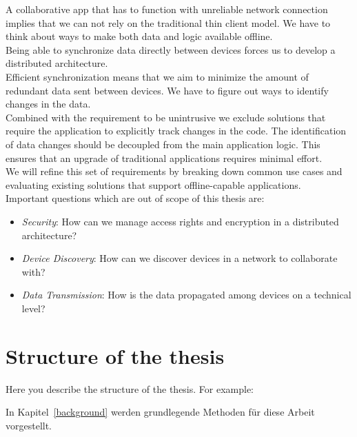 A collaborative app that has to function with unreliable network connection implies that we can not rely on the traditional thin client model.
We have to think about ways to make both data and logic available offline.\\

Being able to synchronize data directly between devices forces us to develop a distributed architecture.\\

Efficient synchronization means that we aim to minimize the amount of redundant data sent between devices.
We have to figure out ways to identify changes in the data.\\

Combined with the requirement to be unintrusive we exclude solutions that require the application to explicitly track changes in the code.
The identification of data changes should be decoupled from the main application logic.
This ensures that an upgrade of traditional applications requires minimal effort.\\

We will refine this set of requirements by breaking down common use cases and evaluating existing solutions that support offline-capable applications.\\

Important questions which are out of scope of this thesis are:

\begin{itemize}
\item \emph{Security}: How can we manage access rights and encryption in a distributed architecture?
\item \emph{Device Discovery}: How can we discover devices in a network to collaborate with?
\item \emph{Data Transmission}: How is the data propagated among devices on a technical level?
\end{itemize}

\section{Structure of the thesis}
Here you describe the structure of the thesis. For example:

In Kapitel~\ref{background} werden grundlegende Methoden für diese Arbeit vorgestellt.